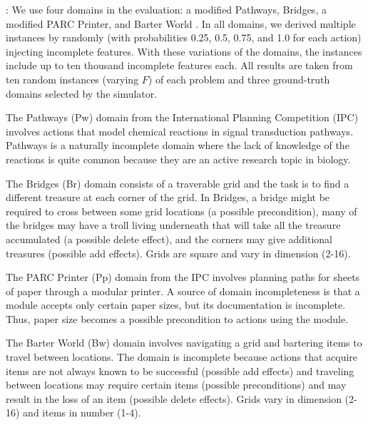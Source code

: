 \documentclass[letterpaper]{article}
\def\und#1{\noindent{\bf #1}:}
\def\citep#1{\cite{#1}}
\begin{document}
\und{Domains} We use four domains in the evaluation: a modified Pathways,
Bridges,  a modified PARC Printer, and Barter World \citep{bryce-icaps11}.  In
all domains, we derived multiple instances by randomly (with probabilities 0.25,
0.5, 0.75, and 1.0 for each action) injecting incomplete  features.   
With these variations of the domains, the instances include up to ten thousand
incomplete  features each. All results are taken from ten random instances
(varying $F$) of each problem and three ground-truth domains selected by the
simulator.

The Pathways (Pw) domain from the International Planning Competition  (IPC) involves actions that model chemical reactions in signal
transduction pathways.  Pathways is a naturally incomplete domain where the lack
of knowledge of the reactions is quite common because they are an active
research topic in biology.  

The Bridges (Br) domain consists of a traverable grid and the task is to find a
different treasure at each corner of the grid. In Bridges,
a bridge might be required  to cross between some grid locations (a possible
precondition), many of the bridges may have a troll living
underneath that will take all the treasure accumulated (a possible delete
effect), and the corners may give additional treasures (possible add
effects).  Grids are square and vary in dimension (2-16).

The PARC Printer (Pp) domain from the IPC involves planning paths for sheets of
paper through a modular printer.  A source of domain incompleteness is that a module
accepts only certain paper sizes, but its documentation is incomplete.  Thus,
paper size becomes a possible precondition to actions using the module.

The Barter World (Bw) domain involves navigating a grid and bartering items to
travel between locations.  The domain is incomplete because actions that acquire
 items are not always known to be successful (possible add effects) and traveling between locations may require
certain items (possible preconditions) and may result in the loss of an item
(possible delete effects). Grids vary in dimension (2-16) and items
in number (1-4).
\end{document}
